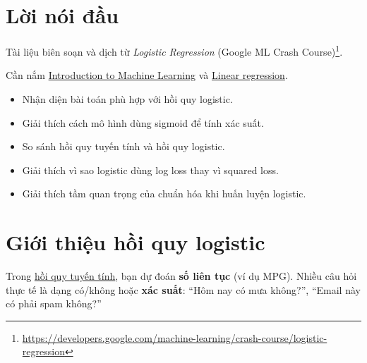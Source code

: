 \documentclass[12pt,a4paper]{article}
\begin{document}

\newpage
\tableofcontents
\newpage

\section*{Lời nói đầu}

\begin{ynghia}[title={Nguồn và cách đọc}]
Tài liệu biên soạn và dịch từ \emph{Logistic Regression} (Google ML Crash Course)\footnote{\url{https://developers.google.com/machine-learning/crash-course/logistic-regression}}.
\end{ynghia}

\begin{luuy}[title={Điều kiện tiên quyết}]
Cần nắm \href{https://developers.google.com/machine-learning/intro-to-ml}{Introduction to Machine Learning} và \href{https://developers.google.com/machine-learning/crash-course/linear-regression}{Linear regression}.
\end{luuy}

\begin{phuongphap}[title={target học tập}]
\begin{itemize}
  \item Nhận diện bài toán phù hợp với hồi quy logistic.
  \item Giải thích cách mô hình dùng sigmoid để tính xác suất.
  \item So sánh hồi quy tuyến tính và hồi quy logistic.
  \item Giải thích vì sao logistic dùng log loss thay vì squared loss.
  \item Giải thích tầm quan trọng của chuẩn hóa khi huấn luyện logistic.
\end{itemize}
\end{phuongphap}

\newpage

\section{Giới thiệu hồi quy logistic}

\begin{dongco}[title={Từ MPG sang ``có mưa không?''}]
Trong \href{https://developers.google.com/machine-learning/crash-course/linear-regression}{hồi quy tuyến tính}, bạn dự đoán \textbf{số liên tục} (ví dụ MPG). Nhiều câu hỏi thực tế là dạng có/không hoặc \textbf{xác suất}: ``Hôm nay có mưa không?'', ``Email này có phải spam không?''
\end{dongco}
\end{document}

